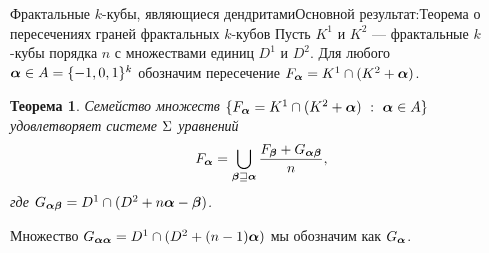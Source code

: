 \documentclass[aspectratio=1610, 10pt, notheorems]{beamer}
\newtheorem{theorem}     {Теорема}
\newtheorem{lemma}       {Лемма}
\newtheorem{definition}  {Определение}
\begin{document}
\begin{frame}{Фрактальные $k$-кубы, являющиеся дендритами}{Основной результат:Теорема о пересечениях граней фрактальных $k$-кубов }
Пусть $K^1$ и $K^2$ --- фрактальные $k$-кубы порядка $n$ с множествами единиц $D^1$ и $D^2$.
Для любого ${\bm{\alpha}}\in A=\{-1,0,1\}^k$ обозначим пересечение $F_{\bm{\alpha}}=K^1\cap(K^2+{\bm{\alpha}})$.

\begin{theorem}\label{IFC}
Семейство множеств $\{F_{\bm{\alpha}}=K^1\cap(K^2+{\bm{\alpha}})\ :\ {\bm{\alpha}}\in A\}$ удовлетворяет системе $\Sigma$ уравнений 
$$F_{\bm{\alpha}}=\bigcup\limits_{{\bm{\beta}}\sqsupseteq{\bm{\alpha}}} 
\dfrac{F_{\bm{\beta}}+G_{{\bm{\alpha}}{\bm{\beta}}}}{n},$$
где $G_{{\bm{\alpha}}{\bm{\beta}}}=D^1\cap(D^2+n{\bm{\alpha}}-{\bm{\beta}})$.
\end{theorem}
Множество $G_{{\bm{\alpha}}{\bm{\alpha}}}=D^1\cap(D^2+(n-1){\bm{\alpha}})$ мы обозначим как $G_{{\bm{\alpha}}}$.
\end{frame}


%
%
\end{document}

